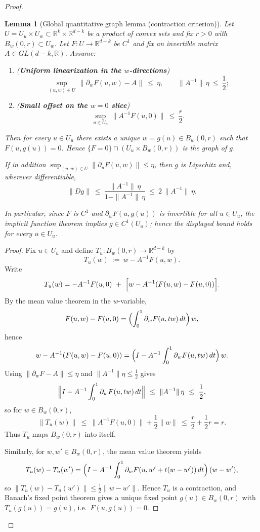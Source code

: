 \documentclass[11pt]{article}
\newcommand{\REVMZ}[1]{\textcolor{teal}{#1}}  %
\numberwithin{equation}{section}  %
\theoremstyle{plain}
\newtheorem{lemma}[theorem]{Lemma}
\theoremstyle{definition}
\theoremstyle{remark}
\newcommand{\R}{\mathbb{R}}
\begin{document}
\begin{proof}
\begin{lemma}[Global quantitative graph lemma (contraction criterion)]\label{lem:global-graph-contraction}
Let $U=U_u\times U_w\subset \R^{k}\times \R^{d-k}$ be a product of convex sets and fix $r>0$ with $B_w(0,r)\subset U_w$.
Let $F:U\to \R^{d-k}$ be $C^{1}$ and fix an invertible matrix $A\in GL(d-k,\R)$.
Assume:
\begin{enumerate}
\item[\textnormal{(i)}] (\textbf{Uniform linearization in the $w$-directions})
\[
\sup_{(u,w)\in U}\,\|\partial_w F(u,w)-A\|\ \le\ \eta,
\qquad
\|A^{-1}\|\,\eta\ \le\ \frac12;
\]
\item[\textnormal{(ii)}] (\textbf{Small offset on the $w=0$ slice})
\[
\sup_{u\in U_u}\,\|A^{-1}F(u,0)\|\ \le\ \frac{r}{2}.
\]
\end{enumerate}
Then for every $u\in U_u$ there exists a \emph{unique} $w=g(u)\in B_w(0,r)$ such that $F(u,g(u))=0$.
Hence $\{F=0\}\cap (U_u\times B_w(0,r))$ is the graph of $g$.

\smallskip\noindent
If in addition $\sup_{(u,w)\in U}\|\partial_u F(u,w)\|\le \eta$, then $g$ is Lipschitz and, wherever differentiable,
\[
\|Dg\|\ \le\ \frac{\|A^{-1}\|\,\eta}{1-\|A^{-1}\|\,\eta}\ \le\ 2\,\|A^{-1}\|\,\eta.
\]

In particular, since $F$ is $C^1$ and $\partial_wF(u,g(u))$ is invertible for all $u\in U_u$, the implicit function theorem \REVMZ{\cite{LangGmT}} implies $g\in C^1(U_u)$; hence the displayed bound holds for every $u\in U_u$.


\end{lemma}
\begin{proof}
Fix $u\in U_u$ and define $T_u:B_w(0,r)\to \R^{d-k}$ by
\[
T_u(w)\ :=\ w - A^{-1}F(u,w).
\]
Write
\[
T_u(w)= -A^{-1}F(u,0)\ +\ \Bigl[w - A^{-1}(F(u,w)-F(u,0))\Bigr].
\]
By the mean value theorem in the $w$-variable,
\[
F(u,w)-F(u,0)=\Bigl(\int_0^1 \partial_w F(u,tw)\,dt\Bigr)\,w,
\]
hence
\[
w - A^{-1}(F(u,w)-F(u,0))
=\Bigl(I - A^{-1}\int_0^1 \partial_wF(u,tw)\,dt\Bigr)\,w.
\]
Using $\|\partial_wF-A\|\le \eta$ and $\|A^{-1}\|\eta\le \tfrac12$ gives
\[
\Bigl\|I - A^{-1}\int_0^1 \partial_wF(u,tw)\,dt\Bigr\|\ \le\ \|A^{-1}\|\,\eta\ \le\ \frac12,
\]
so for $w\in B_w(0,r)$,
\[
\|T_u(w)\|\ \le\ \|A^{-1}F(u,0)\| + \frac12\|w\|\ \le\ \frac r2 + \frac12 r = r.
\]
Thus $T_u$ maps $B_w(0,r)$ into itself.

Similarly, for $w,w'\in B_w(0,r)$, the mean value theorem yields
\[
T_u(w)-T_u(w')
=\Bigl(I - A^{-1}\int_0^1 \partial_wF(u,w'+t(w-w'))\,dt\Bigr)\,(w-w'),
\]
so $\|T_u(w)-T_u(w')\|\le \tfrac12\|w-w'\|$.  Hence $T_u$ is a contraction, and Banach's fixed point theorem
gives a unique fixed point $g(u)\in B_w(0,r)$ with $T_u(g(u))=g(u)$, i.e.\ $F(u,g(u))=0$.


\end{proof}
\end{proof}
\end{document}
